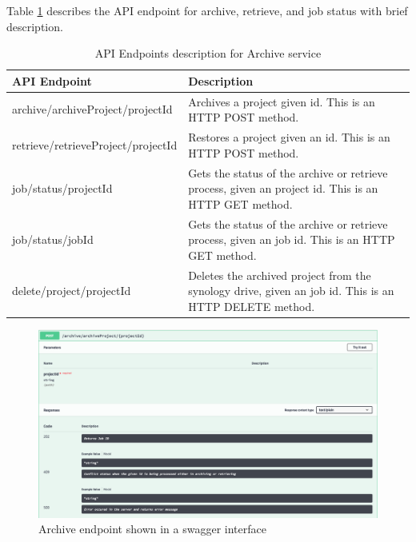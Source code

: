     Table \ref{table:archiveEndpoints} describes the API endpoint for archive, retrieve, and job status with brief description.
    \begin{table}[H]
        \centering
        \begin{tabular}{|p{6cm}|p{8cm}|}
            \hline
                \textbf{API Endpoint}&\textbf{Description}\\
            \hline
                archive/archiveProject/{{projectId}} & Archives a project given id. This is an HTTP POST method.\\
            \hline
                retrieve/retrieveProject/{{projectId}} & Restores a project given an id. This is an HTTP POST method.\\
            \hline
                job/status/{{projectId}} & Gets the status of the archive or retrieve process, given an project id. This is an HTTP GET method.\\
            \hline
                job/status/{{jobId}} & Gets the status of the archive or retrieve process, given an job id. This is an HTTP GET method.\\
            \hline
                delete/project/{{projectId}} & Deletes the archived project from the synology drive, given an job id. This is an HTTP DELETE method.\\
            \hline
        \end{tabular}
        \caption{API Endpoints description for Archive service}
        \label{table:archiveEndpoints}     
    \end{table}  
    \begin{figure}[H]
        \centering \includegraphics[scale=0.3]{grafiken/archiveSwagger.png}
        \caption{Archive endpoint shown in a swagger interface}
        \label{fig:archiveSwagger}
    \end{figure}

